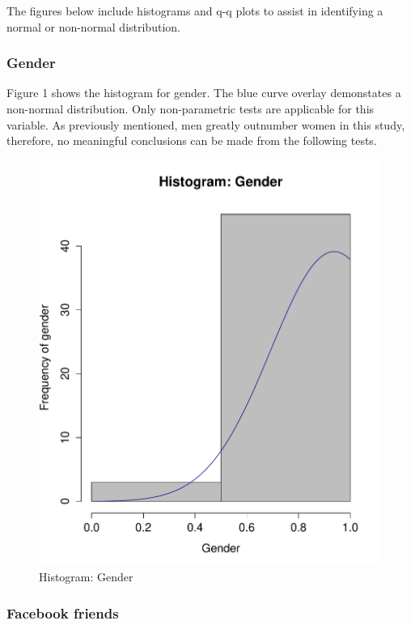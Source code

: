 The figures below include histograms and q-q plots to assist in identifying a normal or non-normal distribution.

\subsubsection{Gender}

Figure 1 shows the histogram for gender. The blue curve overlay demonstates a non-normal distribution. Only non-parametric tests are applicable for this variable. As previously mentioned, men greatly outnumber women in this study, therefore, no meaningful conclusions can be made from the following tests.

\begin{figure}[H]
\centering
\caption{Histogram: Gender}
\includegraphics[scale=0.35]{./img/hist_gender.pdf}
\end{figure}

\subsubsection{Facebook friends}

